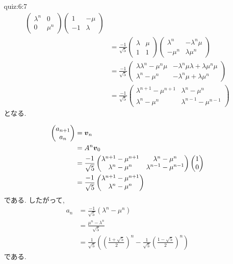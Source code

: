 \begin{answerof}{quiz:6:7}
\begin{align*}
\begin{pmatrix}
    \lambda^n&0\\
    0&\mu^n
  \end{pmatrix}
  \begin{pmatrix}
    1&-\mu\\
    -1&\lambda    
  \end{pmatrix}
\\
&=\frac{-1}{\sqrt{5}}
  \begin{pmatrix}
    \lambda&\mu\\
    1&1    
  \end{pmatrix}
  \begin{pmatrix}
    \lambda^n&-\lambda^n\mu\\
    -\mu^n&\lambda\mu^n    
  \end{pmatrix}
\\
&=\frac{-1}{\sqrt{5}}
  \begin{pmatrix}
    \lambda\lambda^n-\mu^n\mu&-\lambda^n\mu\lambda+\lambda\mu^n\mu\\
    \lambda^n-\mu^n&-\lambda^n\mu+\lambda\mu^n        
  \end{pmatrix}\\
&=\frac{-1}{\sqrt{5}}
  \begin{pmatrix}
    \lambda^{n+1}-\mu^{n+1}&\lambda^n-\mu^n\\
    \lambda^n-\mu^n&\lambda^{n-1}-\mu^{n-1}        
  \end{pmatrix}
\end{align*}
となる.

\begin{align*}
  \begin{pmatrix}a_{n+1}\\a_n\end{pmatrix}
    &=
    \boldsymbol{v}_n\\
    &=
    A^n\boldsymbol{v}_0\\
    &=
    \frac{-1}{\sqrt{5}}
    \begin{pmatrix}
      \lambda^{n+1}-\mu^{n+1}&\lambda^n-\mu^n\\
      \lambda^n-\mu^n&\lambda^{n-1}-\mu^{n-1}        
    \end{pmatrix}
    \begin{pmatrix}1\\0\end{pmatrix}\\
    &=
    \frac{-1}{\sqrt{5}}
    \begin{pmatrix}
      \lambda^{n+1}-\mu^{n+1}\\
      \lambda^n-\mu^n
    \end{pmatrix}
\end{align*}
である.
したがって,
\begin{align*}
  a_n&=
    \frac{-1}{\sqrt{5}}
    (\lambda^n-\mu^n)\\
    &=
    \frac{\mu^n-\lambda^n}{\sqrt{5}}
    \\
    &=\frac{1}{\sqrt{5}}\left(\left(\frac{1+\sqrt{5}}{2}\right)^n
    -\frac{1}{\sqrt{5}}\left(\frac{1-\sqrt{5}}{2}\right)^n\right)
\end{align*}
である.
\end{answerof}
